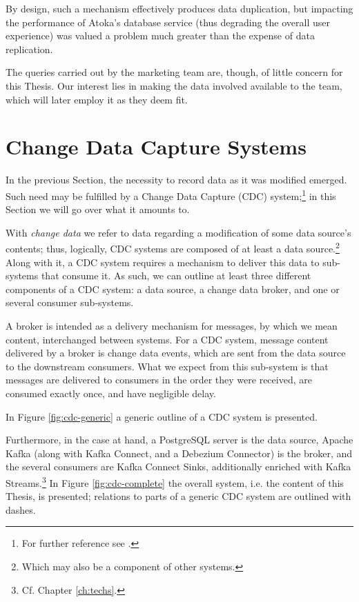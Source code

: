 By design, such a mechanism effectively produces data duplication, but impacting the performance of Atoka's database service (thus degrading the overall user experience) was valued a problem much greater than the expense of data replication.

The queries carried out by the marketing team are, though, of little concern for this Thesis.
Our interest lies in making the data involved available to the team, which will later employ it as they deem fit.


\section{Change Data Capture Systems}
\label{sec:cdc}

In the previous Section, the necessity to record data as it was modified emerged.
Such need may be fulfilled by a Change Data Capture (CDC) system;\footnote{%
For further reference see \cite{cdc}.
} in this Section we will go over what it amounts to.

With \emph{change data} we refer to data regarding a modification of some data source's contents; thus, logically, CDC systems are composed of at least a data source.\footnote{%
Which may also be a component of other systems.}
Along with it, a CDC system requires a mechanism to deliver this data to sub-systems that consume it.
As such, we can outline at least three different components of a CDC system: a data source, a change data broker, and one or several consumer sub-systems.

A broker is intended as a delivery mechanism for messages, by which we mean content, interchanged between systems.
For a CDC system, message content delivered by a broker is change data events, which are sent from the data source to the downstream consumers.
What we expect from this sub-system is that messages are delivered to consumers in the order they were received, are consumed exactly once, and have negligible delay.

In Figure \ref{fig:cdc-generic} a generic outline of a CDC system is presented.

Furthermore, in the case at hand, a PostgreSQL server is the data source, Apache Kafka (along with Kafka Connect, and a Debezium Connector) is the broker, and the several consumers are Kafka Connect Sinks, additionally enriched with Kafka Streams.\footnote{Cf. Chapter \ref{ch:techs}.}
In Figure \ref{fig:cdc-complete} the overall system, i.e. the content of this Thesis, is presented; relations to parts of a generic CDC system are outlined with dashes.

